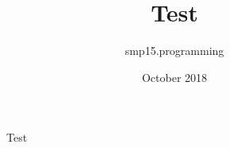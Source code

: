 \documentclass{article}
\title{Test}
\author{smp15.programming }
\date{October 2018}
\begin{document}
\maketitle

\begin{figure}
    \centering
    \caption{Test}
    \label{fig:my_label}
\end{figure}



\end{document}

